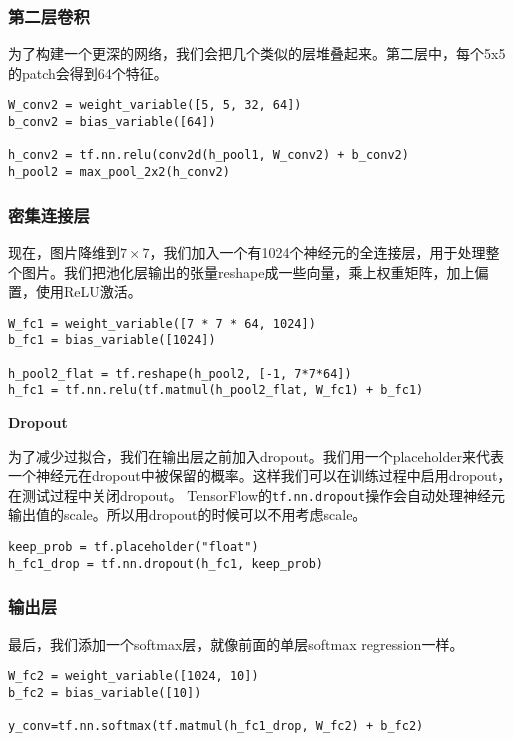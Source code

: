 \subsubsection{第二层卷积}

为了构建一个更深的网络，我们会把几个类似的层堆叠起来。第二层中，每个5x5的patch会得到64个特征。

\begin{lstlisting}
W_conv2 = weight_variable([5, 5, 32, 64])
b_conv2 = bias_variable([64])

h_conv2 = tf.nn.relu(conv2d(h_pool1, W_conv2) + b_conv2)
h_pool2 = max_pool_2x2(h_conv2)
\end{lstlisting}

\subsubsection{密集连接层}

现在，图片降维到$7\times7$，我们加入一个有1024个神经元的全连接层，用于处理整个图片。我们把池化层输出的张量reshape成一些向量，乘上权重矩阵，加上偏置，使用ReLU激活。

\begin{lstlisting}
W_fc1 = weight_variable([7 * 7 * 64, 1024])
b_fc1 = bias_variable([1024])

h_pool2_flat = tf.reshape(h_pool2, [-1, 7*7*64])
h_fc1 = tf.nn.relu(tf.matmul(h_pool2_flat, W_fc1) + b_fc1)
\end{lstlisting}

\textbf{Dropout}

为了减少过拟合，我们在输出层之前加入dropout。我们用一个placeholder来代表一个神经元在dropout中被保留的概率。这样我们可以在训练过程中启用dropout，在测试过程中关闭dropout。 TensorFlow的\lstinline{tf.nn.dropout}操作会自动处理神经元输出值的scale。所以用dropout的时候可以不用考虑scale。

\begin{lstlisting}
keep_prob = tf.placeholder("float")
h_fc1_drop = tf.nn.dropout(h_fc1, keep_prob)
\end{lstlisting}

\subsubsection{输出层}

最后，我们添加一个softmax层，就像前面的单层softmax regression一样。

\begin{lstlisting}
W_fc2 = weight_variable([1024, 10])
b_fc2 = bias_variable([10])

y_conv=tf.nn.softmax(tf.matmul(h_fc1_drop, W_fc2) + b_fc2)
\end{lstlisting}

